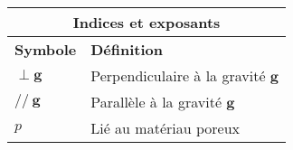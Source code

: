 \bigskip

\begin{center}
	\begin{tabular}{ll}
		\multicolumn{2}{c}{Indices et exposants}  \\\hline
		\textbf{Symbole} & \textbf{Définition} \\\hline\hline
		$\perp \mathbf g$ & Perpendiculaire à la gravité $\mathbf g$ \\
		$//~\mathbf g$ & Parallèle à la gravité $\mathbf g$ \\
		$p$ & Lié au matériau poreux
	\end{tabular}
\end{center}
